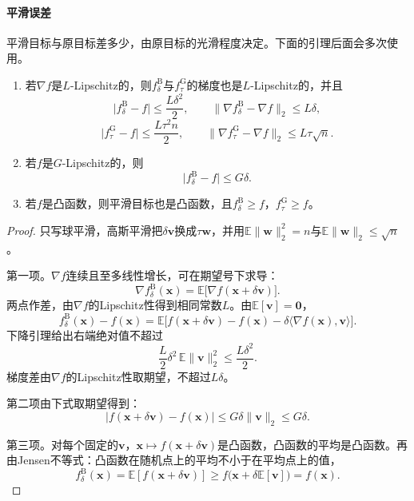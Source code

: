 \paragraph{平滑误差}
平滑目标与原目标差多少，由原目标的光滑程度决定。下面的引理后面会多次使用。

\begin{lemma}[平滑的基本性质]
\label{lem:zo-smoothing-properties}
\begin{enumerate}
 \item 若$\nabla f$是$L$-Lipschitz的，则$f^{\mathrm{B}}_{\delta}$与$f^{\mathrm{G}}_{\tau}$的梯度也是$L$-Lipschitz的，并且
 \begin{equation}
  \lvert f^{\mathrm{B}}_{\delta}-f\rvert\leq\frac{L\delta^2}{2},\qquad
  \lVert\nabla f^{\mathrm{B}}_{\delta}-\nabla f\rVert_2\leq L\delta,
  \label{eq:zo-ball-error}
 \end{equation}
 \begin{equation}
  \lvert f^{\mathrm{G}}_{\tau}-f\rvert\leq\frac{L\tau^2n}{2},\qquad
  \lVert\nabla f^{\mathrm{G}}_{\tau}-\nabla f\rVert_2\leq L\tau\sqrt{n}.
  \label{eq:zo-gauss-error}
 \end{equation}
 \item 若$f$是$G$-Lipschitz的，则
 \begin{equation}
  \lvert f^{\mathrm{B}}_{\delta}-f\rvert\leq G\delta.
  \label{eq:zo-lipschitz-error}
 \end{equation}
 \item 若$f$是凸函数，则平滑目标也是凸函数，且$f^{\mathrm{B}}_{\delta}\geq f$，$f^{\mathrm{G}}_{\tau}\geq f$。
\end{enumerate}
\end{lemma}

\begin{proof}
只写球平滑，高斯平滑把$\delta\bm{v}$换成$\tau\bm{w}$，并用$\mathbb{E}\lVert\bm{w}\rVert_2^2=n$与$\mathbb{E}\lVert\bm{w}\rVert_2\leq\sqrt{n}$。

第一项。$\nabla f$连续且至多线性增长，可在期望号下求导：
\[
 \nabla f^{\mathrm{B}}_{\delta}(\bm{x})=\mathbb{E}\bigl[\nabla f(\bm{x}+\delta\bm{v})\bigr].
\]
两点作差，由$\nabla f$的Lipschitz性得到相同常数$L$。由$\mathbb{E}[\bm{v}]=\bm{0}$，
\[
 f^{\mathrm{B}}_{\delta}(\bm{x})-f(\bm{x})=\mathbb{E}\bigl[f(\bm{x}+\delta\bm{v})-f(\bm{x})-\delta\langle\nabla f(\bm{x}),\bm{v}\rangle\bigr].
\]
下降引理给出右端绝对值不超过
\[
 \frac{L}{2}\delta^2\,\mathbb{E}\lVert\bm{v}\rVert_2^2\leq\frac{L\delta^2}{2}.
\]
梯度差由$\nabla f$的Lipschitz性取期望，不超过$L\delta$。

第二项由下式取期望得到：
\[
 \lvert f(\bm{x}+\delta\bm{v})-f(\bm{x})\rvert\leq G\delta\lVert\bm{v}\rVert_2\leq G\delta.
\]

第三项。对每个固定的$\bm{v}$，$\bm{x}\mapsto f(\bm{x}+\delta\bm{v})$是凸函数，凸函数的平均是凸函数。再由Jensen不等式：凸函数在随机点上的平均不小于在平均点上的值，
\[
 f^{\mathrm{B}}_{\delta}(\bm{x})=\mathbb{E}[f(\bm{x}+\delta\bm{v})]\geq f\bigl(\bm{x}+\delta\mathbb{E}[\bm{v}]\bigr)=f(\bm{x}).
\]
\end{proof}

